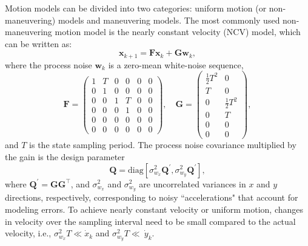 \documentclass[times]{asjcauth}
\begin{document}
Motion models can be divided into two categories: uniform motion (or non-maneuvering) models and maneuvering models. The most commonly used non-maneuvering motion model is the nearly constant velocity (NCV) model, which can be written as:
\begin{equation}\label{eqnstate1}
  \mathbf{x}_{k+1} = \mathbf{F}\mathbf{x}_{k} + \mathbf{G}\mathbf{w}_{k},
\end{equation}
\noindent where the process noise $\mathbf{w}_{k}$ is a zero-mean white-noise sequence,
\begin{equation*}
\mathbf{F} = \left(%
\begin{array}{cccccc}
  1 & T & 0 & 0 & 0 & 0\\
  0 & 1 & 0 & 0 & 0 & 0\\
  0 & 0 & 1 & T & 0 & 0\\
  0 & 0 & 0 & 1 & 0 & 0\\
  0 & 0 & 0 & 0 & 0 & 0\\
  0 & 0 & 0 & 0 & 0 & 0
\end{array}%
\right), \quad \mathbf{G} = \left(%
\begin{array}{cc}
  \frac{1}{2}T^{2} & 0\\
  T & 0\\
  0 & \frac{1}{2}T^{2}\\
  0 & T\\
  0 & 0\\
  0 & 0
\end{array}%
\right),
\end{equation*}
\noindent and $T$ is the state sampling period. The process noise covariance multiplied by the gain is the design parameter
\begin{equation*}
\mathbf{Q} = \mathrm{diag}\left[\sigma^{2}_{w_{x}}\mathbf{Q}^{\prime},\sigma^{2}_{w_{y}}\mathbf{Q}^{\prime}\right],
\end{equation*}
where $\mathbf{Q}^{\prime} = \mathbf{G}\mathbf{G}^{\top}$, and $\sigma^{2}_{w_{x}}$ and $\sigma^{2}_{w_{y}}$ are uncorrelated variances in $x$ and $y$ directions, respectively, corresponding to noisy ``accelerations" that account for modeling errors. To achieve nearly constant velocity or uniform motion, changes in velocity over the sampling interval need to be small compared to the actual velocity, i.e., $\sigma^{2}_{w_{x}}T \ll \dot{x}_{k}$ and $\sigma^{2}_{w_{y}}T \ll~\dot{y}_{k}$.
\end{document}
